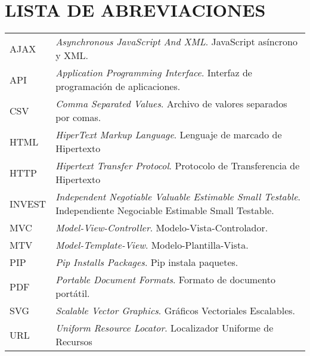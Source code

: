 \chapter*{LISTA DE ABREVIACIONES}

\begin{tabular}{l p{12cm}}
    AJAX \hspace{1cm}   & \textit{Asynchronous JavaScript And XML}. JavaScript asíncrono y XML.\\
    API \hspace{1cm}   & \textit{Application Programming Interface}. Interfaz de programación de aplicaciones.\\
    CSV \hspace{1cm}   & \textit{Comma Separated Values}. Archivo de valores separados por comas.\\
    HTML \hspace{1cm}   & \textit{HiperText Markup Language}. Lenguaje de marcado de Hipertexto \\
    HTTP \hspace{1cm}   & \textit{Hipertext Transfer Protocol}. Protocolo de
                               Transferencia de Hipertexto            \\
    INVEST \hspace{1cm} &  \textit{Independent Negotiable Valuable Estimable Small Testable}. Independiente Negociable Estimable Small Testable. \\
    MVC \hspace{1cm}    & \textit{Model-View-Controller}. Modelo-Vista-Controlador.\\
    MTV \hspace{1cm}    & \textit{Model-Template-View}. Modelo-Plantilla-Vista. \\
    PIP \hspace{1cm}    & \textit{Pip Installs Packages}. Pip instala paquetes.\\
    PDF \hspace{1cm}    & \textit{Portable Document Formats}. Formato de documento portátil.\\
    SVG	\hspace{1cm}    & \textit{Scalable Vector Graphics}. Gráficos Vectoriales Escalables.\\
    URL	 \hspace{1cm}   & \textit{Uniform Resource Locator}. Localizador Uniforme de Recursos \\

\end{tabular}
\clearpage
